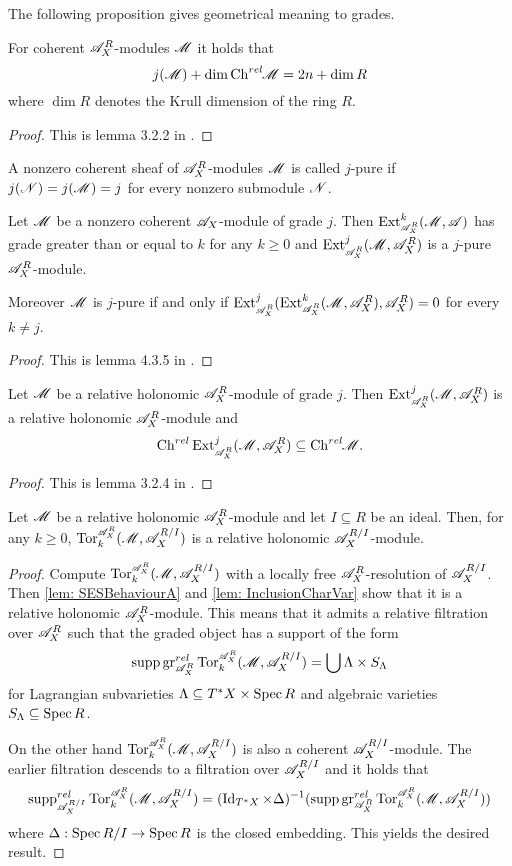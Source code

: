 The following proposition gives geometrical meaning to grades.
\begin{proposition}\label{prop: AXRBehaviourGradesJAndChrel}
  For coherent $\mathscr{A}_X^R$-modules $\mathscr{M}$ it holds that
  $$j(\mathscr{M}) + \dim \operatorname{Ch}^{rel}\mkern-5mu \mathscr{M} = 2n + \dim R $$
  where $\dim R$ denotes the Krull dimension of the ring $R$.
\end{proposition}
\begin{proof}
  This is lemma 3.2.2 in \cite{budur2019zero}.
\end{proof}
\begin{definition}
  A nonzero coherent sheaf of $\mathscr{A}_X^R$-modules $\mathscr{M}$ is called $j$-pure if $j(\mathscr{N})=j(\mathscr{M})=j$ for every nonzero submodule $\mathscr{N}$.
\end{definition}
\begin{lemma}\label{lem: ExtGrade}
  Let $\mathscr{M}$ be a nonzero coherent $\mathscr{A}_X$-module of grade $j$. Then $\Ex{\A_X^R}{k}(\M,\A)$ has grade greater than or equal to $k$ for any $k\geq 0$ and $\Ex{\A_X^R}{j}(\M,\A_X^R)$ is a $j$-pure $\mathscr{A}_X^R$-module.

  Moreover $\mathscr{M}$ is $j$-pure if and only if $\Ex{\A_X^R}{j}(\Ex{\A_X^R}{k}(\M,\A_X^R),\A_X^R)=0$ for every $k\neq j$.
\end{lemma}
\begin{proof}
  This is lemma 4.3.5 in \cite{budur2019zero}.
\end{proof}
\begin{lemma}
  Let $\mathscr{M}$ be a relative holonomic $\mathscr{A}_X^R$-module of grade $j$. Then $\Ex{\A_X^R}{j}(\M,\A_X^R)$ is a relative holonomic $\mathscr{A}_X^R$-module and
  $$\Ch^{rel}\Ex{\A_X^R}{j}(\M,\A_X^R)\subseteq \Chrel \M. $$
\end{lemma}
\begin{proof}
  This is lemma 3.2.4 in \cite{budur2019zero}.
\end{proof}
\begin{lemma}\label{lem: TorRelHol}
  Let $\mathscr{M}$ be a relative holonomic $\mathscr{A}_X^R$-module and let $I\subseteq R$ be an ideal. Then, for any $k\geq 0$, $\Tr{\A_X^R}{k}(\M, \A_X^{R/I})$ is a relative holonomic $\mathscr{A}_X^{R/I}$-module.
 \end{lemma}
\begin{proof}
  Compute $\Tr{\A_X^R}{k}(\M, \A_X^{R/I})$ with a locally free $\mathscr{A}_X^R$-resolution of $\mathscr{A}_X^{R/I}$.
  Then \cref{lem: SESBehaviourA} and \cref{lem: InclusionCharVar} show that it is a relative holonomic $\mathscr{A}_X^R$-module.
  This means that it admits a relative filtration over $\mathscr{A}_X^R$ such that the graded object has a support of the form
  $$\supp \gr_{\A_X^R}^{rel} \Tr{\A_X^R}{k}(\M, \A_X^{R/I}) = \bigcup \Lambda \times S_\Lambda$$
  for Lagrangian subvarieties $\Lambda \subseteq T^* X \times \operatorname{Spec} R$ and algebraic varieties $S_\Lambda \subseteq \operatorname{Spec} R$.

  On the other hand $\Tr{\A_X^R}{k}(\M, \A_X^{R/I})$ is also a coherent $\mathscr{A}_X^{R/I}$-module.
  The earlier filtration descends to a filtration over $\mathscr{A}_X^{R/I}$ and it holds that
  $$\supp_{\A_X^{R/I}}^{rel} \Tr{\A_X^R}{k}(\M, \A_X^{R/I}) =(\Id_{T^*X} \times \Delta)^{-1}(\supp \gr_{\A_X^R}^{rel} \Tr{\A_X^R}{k}(\M, \A_X^{R/I}))$$
  where $\Delta:\operatorname{Spec} R/I\to \operatorname{Spec} R$ is the closed embedding.
  This yields the desired result.
\end{proof}
